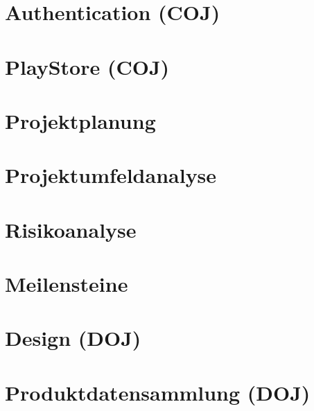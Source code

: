 \documentclass[
    headings=optiontotocandhead,%
    twoside,
    numbers=noenddot,%
    toc=flat, %
    12pt, %
    titlepage, %
    parskip=full, %
    listof=totoc, %
    listof=flat, %
    numbers=noenddot, %
    bibliography=totoc, %
    a4paper,DIV=14,
    BCOR=15mm,
]{scrbook}
\begin{document}
\chapter{Authentication (COJ)}
\renewcommand{\kapitelautor}{Autor: Filip Coja}


\chapter{PlayStore (COJ)}
\renewcommand{\kapitelautor}{Autor: Filip Coja}



\chapter{Projektplanung}
\renewcommand{\kapitelautor}{Autor: Rafael Doja}


\chapter{Projektumfeldanalyse}
\renewcommand{\kapitelautor}{Autor: Rafael Doja}


\chapter{Risikoanalyse}
\renewcommand{\kapitelautor}{Autor: Rafael Doja}


\chapter{Meilensteine}
\renewcommand{\kapitelautor}{Autor: Rafael Doja}



\chapter{Design (DOJ)}
\renewcommand{\kapitelautor}{Autor: Rafael Doja}


\chapter{Produktdatensammlung (DOJ)}
\renewcommand{\kapitelautor}{Autor: Rafael Doja}
\end{document}
